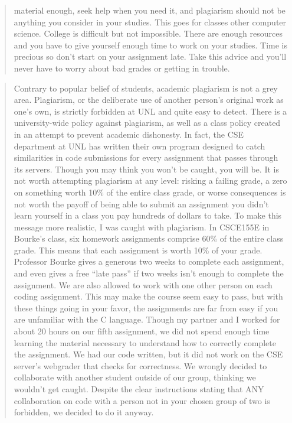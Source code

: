 \documentclass[12pt]{scrartcl}
\begin{document}
\begin{quote}
material enough, seek help when you need it, and plagiarism should not be anything you consider in your studies. This goes for classes other computer science. College is difficult but not impossible. There are enough resources and you have to give yourself enough time to work on your studies. Time is precious so don't start on your assignment late. Take this advice and you'll never have to worry about bad grades or getting in trouble.
\end{quote}

\begin{quote}
Contrary to popular belief of students, academic plagiarism is not a grey area. Plagiarism, or the deliberate use of another person's original work as one's own, is strictly forbidden at UNL and quite easy to detect. There is a university-wide policy against plagiarism, as well as a class policy created in an attempt to prevent academic dishonesty. In fact, the CSE department at UNL has written their own program designed to catch similarities in code submissions for every assignment that passes through its servers. Though you may think you won't be caught, you will be. It is not worth attempting plagiarism at any level: risking a failing grade, a zero on something worth 10\% of the entire class grade, or worse consequences is not worth the payoff of being able to submit an assignment you didn't learn yourself in a class you pay hundreds of dollars to take.
	To make this message more realistic, I was caught with plagiarism. In CSCE155E in Bourke's class, six homework assignments comprise 60\% of the entire class grade. This means that each assignment is worth 10\% of your grade. Professor Bourke gives a generous two weeks to complete each assignment, and even gives a free ``late pass'' if two weeks isn't enough to complete the assignment. We are also allowed to work with one other person on each coding assignment. This may make the course seem easy to pass, but with these things going in your favor, the assignments are far from easy if you are unfamiliar with the C language. 
	Though my partner and I worked for about 20 hours on our fifth assignment, we did not spend enough time learning the material necessary to understand how to correctly complete the assignment. We had our code written, but it did not work on the CSE server's webgrader that checks for correctness. We wrongly decided to collaborate with another student outside of our group, thinking we wouldn't get caught. Despite the clear instructions stating that ANY collaboration on code with a person not in your chosen group of two is forbidden, we decided to do it anyway.

\end{quote}
\end{document}
